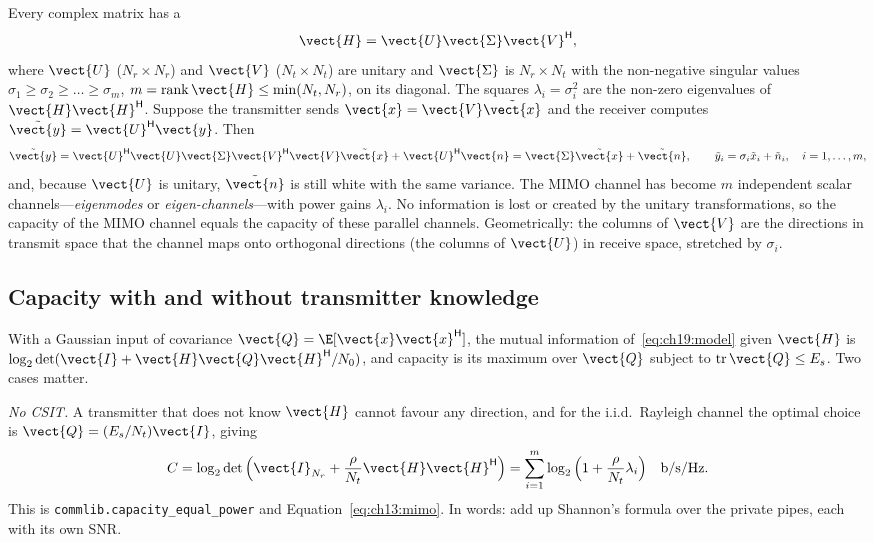 Every complex matrix has a 
\begin{equation}
\vect{H}=\vect{U}\vect{\Sigma}\vect{V}^{\mathsf H},
\label{eq:ch19:svd}
\end{equation}
where $\vect{U}$ ($N_r\times N_r$) and $\vect{V}$ ($N_t\times N_t$) are unitary and $\vect{\Sigma}$
is $N_r\times N_t$ with the non-negative singular values $\sigma_1\ge\sigma_2\ge\dots\ge\sigma_m$,
$m=\operatorname{rank}\vect{H}\le\min(N_t,N_r)$, on its diagonal. The squares $\lambda_i=\sigma_i^2$
are the non-zero eigenvalues of $\vect{H}\vect{H}^{\mathsf H}$. Suppose the transmitter sends
$\vect{x}=\vect{V}\tilde{\vect{x}}$ and the receiver computes $\tilde{\vect{y}}=\vect{U}^{\mathsf H}\vect{y}$.
Then
\begin{equation}
\tilde{\vect{y}}=\vect{U}^{\mathsf H}\vect{U}\vect{\Sigma}\vect{V}^{\mathsf H}\vect{V}\tilde{\vect{x}}+\vect{U}^{\mathsf H}\vect{n}
=\vect{\Sigma}\tilde{\vect{x}}+\tilde{\vect{n}},
\qquad \tilde y_i=\sigma_i\tilde x_i+\tilde n_i,\quad i=1,\dots,m,
\label{eq:ch19:parallel}
\end{equation}
and, because $\vect{U}$ is unitary, $\tilde{\vect{n}}$ is still white with the same variance. The
MIMO channel has become $m$ independent scalar channels---\emph{eigenmodes} or
\emph{eigen-channels}---with power gains $\lambda_i$. No information is lost or created by the
unitary transformations, so the capacity of the MIMO channel equals the capacity of these parallel
channels. Geometrically: the columns of $\vect{V}$ are the directions in transmit space that the
channel maps onto orthogonal directions (the columns of $\vect{U}$) in receive space, stretched by
$\sigma_i$.

\subsection{Capacity with and without transmitter knowledge}

With a Gaussian input of covariance $\vect{Q}=\E[\vect{x}\vect{x}^{\mathsf H}]$, the mutual
information of~\eqref{eq:ch19:model} given $\vect{H}$ is
$\log_2\det(\vect{I}+\vect{H}\vect{Q}\vect{H}^{\mathsf H}/N_0)$, and capacity is its maximum over
$\vect{Q}$ subject to $\operatorname{tr}\vect{Q}\le E_s$. Two cases matter.

\emph{No CSIT.} A transmitter that does not know $\vect{H}$ cannot favour any direction, and for
the i.i.d.\ Rayleigh channel the optimal choice is $\vect{Q}=(E_s/N_t)\vect{I}$, giving
\begin{equation}
C=\log_2\det\Big(\vect{I}_{N_r}+\frac{\rho}{N_t}\vect{H}\vect{H}^{\mathsf H}\Big)
=\sum_{i=1}^m\log_2\Big(1+\frac{\rho}{N_t}\lambda_i\Big)\quad\text{b/s/Hz}.
\label{eq:ch19:capeq}
\end{equation}
This is \texttt{commlib.capacity\_equal\_power} and Equation~\eqref{eq:ch13:mimo}. In words: add up
Shannon's formula over the private pipes, each with its own SNR.

